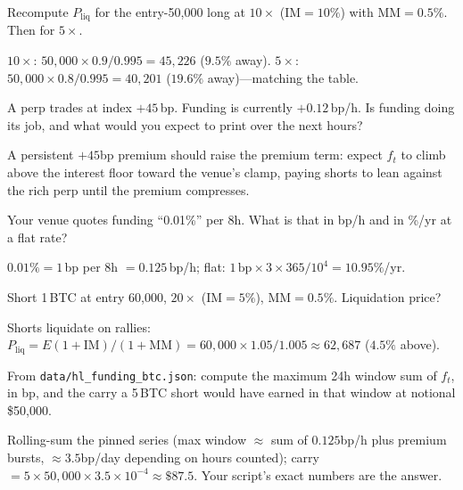 \begin{exercise}[easy]
Recompute $P_{\mathrm{liq}}$ for the entry-50{,}000 long at $10\times$ ($\mathrm{IM}=10\%$) with
$\mathrm{MM}=0.5\%$. Then for $5\times$.
\end{exercise}
\begin{solution}
$10\times$: $50{,}000\times0.9/0.995=45{,}226$ ($9.5\%$ away).
$5\times$: $50{,}000\times0.8/0.995=40{,}201$ ($19.6\%$ away)---matching the table.
\end{solution}

\begin{exercise}[easy]
A perp trades at index $+45$\,bp. Funding is currently $+0.12$\,bp/h. Is funding doing its job,
and what would you expect to print over the next hours?
\end{exercise}
\begin{solution}
A persistent $+45$bp premium should raise the premium term: expect $f_t$ to climb above the
interest floor toward the venue's clamp, paying shorts to lean against the rich perp until the
premium compresses.
\end{solution}

\begin{exercise}[easy]
Your venue quotes funding ``0.01\%'' per 8h. What is that in bp/h and in \%/yr at a flat rate?
\end{exercise}
\begin{solution}
$0.01\%=1$\,bp per 8h $=0.125$\,bp/h; flat: $1\,\mathrm{bp}\times3\times365/10^{4}=10.95\%$/yr.
\end{solution}

\begin{exercise}[easy]
Short 1\,BTC at entry 60{,}000, $20\times$ ($\mathrm{IM}=5\%$), $\mathrm{MM}=0.5\%$. Liquidation
price?
\end{exercise}
\begin{solution}
Shorts liquidate on rallies: $P_{\mathrm{liq}}=E(1+\mathrm{IM})/(1+\mathrm{MM})
=60{,}000\times1.05/1.005\approx62{,}687$ ($4.5\%$ above).
\end{solution}

\begin{exercise}
From \texttt{data/hl\_funding\_btc.json}: compute the maximum 24h window sum of $f_t$, in bp,
and the carry a 5\,BTC short would have earned in that window at notional \$50{,}000.
\end{exercise}
\begin{solution}
Rolling-sum the pinned series (max window $\approx$ sum of $0.125$bp/h plus premium bursts,
$\approx3.5$bp/day depending on hours counted); carry $=5\times50{,}000\times3.5\times10^{-4}
\approx\$87.5$. Your script's exact numbers are the answer.
\end{solution}

